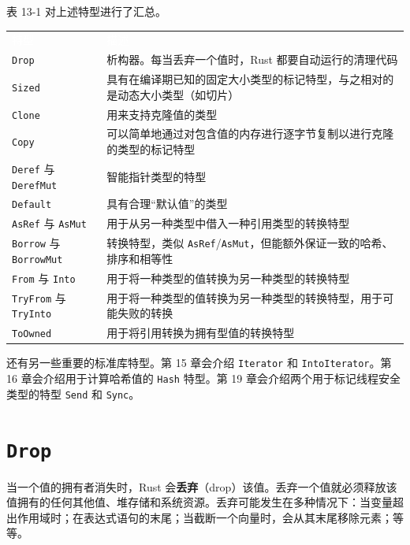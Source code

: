 表 13-1 对上述特型进行了汇总。


\myTableBegin
\begin{tabularx}{\textwidth}{@{}>{\hsize=0.853\hsize\raggedright\arraybackslash}X>{\hsize=1.147\hsize\raggedright\arraybackslash}X@{}}
\rowcolor{tabhead}\textcolor{white}{特型} & \textcolor{white}{描述} \\
\texttt{Drop} & 析构器。每当丢弃一个值时，Rust 都要自动运行的清理代码 \\
\texttt{Sized} & 具有在编译期已知的固定大小类型的标记特型，与之相对的是动态大小类型（如切片） \\
\texttt{Clone} & 用来支持克隆值的类型 \\
\texttt{Copy} & 可以简单地通过对包含值的内存进行逐字节复制以进行克隆的类型的标记特型 \\
\texttt{Deref} 与 \texttt{DerefMut} & 智能指针类型的特型 \\
\texttt{Default} & 具有合理“默认值”的类型 \\
\texttt{AsRef} 与 \texttt{AsMut} & 用于从另一种类型中借入一种引用类型的转换特型 \\
\texttt{Borrow} 与 \texttt{BorrowMut} & 转换特型，类似 \texttt{AsRef}/\texttt{AsMut}，但能额外保证一致的哈希、排序和相等性 \\
\texttt{From} 与 \texttt{Into} & 用于将一种类型的值转换为另一种类型的转换特型 \\
\texttt{TryFrom} 与 \texttt{TryInto} & 用于将一种类型的值转换为另一种类型的转换特型，用于可能失败的转换 \\
\texttt{ToOwned} & 用于将引用转换为拥有型值的转换特型 \\
\end{tabularx}
\myTableEnd

还有另一些重要的标准库特型。第 15 章会介绍 \texttt{Iterator} 和 \texttt{IntoIterator}。第 16 章会介绍用于计算哈希值的 \texttt{Hash} 特型。第 19 章会介绍两个用于标记线程安全类型的特型 \texttt{Send} 和 \texttt{Sync}。

\section{\texttt{Drop}}

当一个值的拥有者消失时，Rust 会\textbf{丢弃}（drop）该值。丢弃一个值就必须释放该值拥有的任何其他值、堆存储和系统资源。丢弃可能发生在多种情况下：当变量超出作用域时；在表达式语句的末尾；当截断一个向量时，会从其末尾移除元素；等等。

